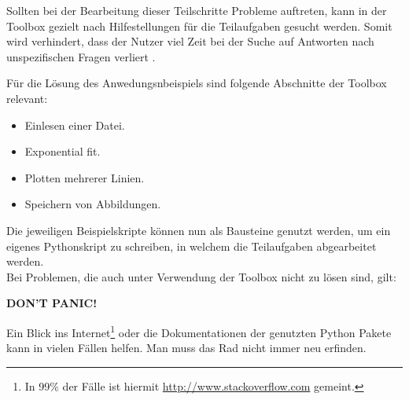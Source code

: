\documentclass[a4paper,fleqn]{article}
\begin{document}
Sollten bei der Bearbeitung dieser Teilschritte Probleme auftreten, kann in der
Toolbox gezielt nach Hilfestellungen für die Teilaufgaben gesucht werden. Somit
wird verhindert, dass der Nutzer viel Zeit bei der Suche auf Antworten nach
unspezifischen Fragen verliert .

\newpage

Für die Lösung des Anwedungsnbeispiels sind folgende Abschnitte der Toolbox
relevant:

\begin{itemize}
  \item Einlesen einer Datei.
  \item Exponential fit.
  \item Plotten mehrerer Linien.
  \item Speichern von Abbildungen.
\end{itemize}

Die jeweiligen Beispielskripte können nun als Bausteine genutzt werden, um ein
eigenes Pythonskript zu schreiben, in welchem die Teilaufgaben abgearbeitet
werden.\\

Bei Problemen, die auch unter Verwendung der Toolbox nicht zu lösen sind, gilt:

\begin{center}
  \textbf{DON'T PANIC!}
\end{center}

Ein Blick ins Internet\footnote{In 99\% der Fälle ist hiermit
\url{http://www.stackoverflow.com} gemeint.} oder die Dokumentationen der
genutzten Python Pakete kann in vielen Fällen helfen.  Man muss das Rad nicht
immer neu erfinden.

\end{document}
